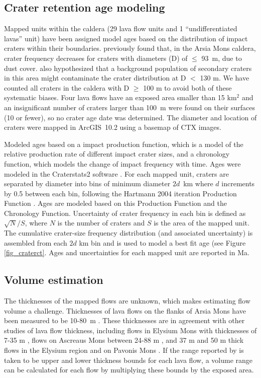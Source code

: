\subsection{Crater retention age modeling}

Mapped units within the caldera (29 lava flow units and 1 ``undifferentiated lavas'' unit) have been assigned model ages based on the distribution of impact craters within their boundaries. \citet{robbins2011volcanic} previously found that, in the Arsia Mons caldera, crater frequency decreases for craters with diameters (D) of $\le$ 93~m, due to dust cover. \citet{robbins2011volcanic} also hypothesized that a background population of secondary craters in this area might contaminate the crater distribution at D $<$ 130 m. We have counted all craters in the caldera with D $\ge$ 100 m to avoid both of these systematic biases. Four lava flows have an exposed area smaller than 15 km$^2$ and an insignificant number of craters larger than 100~m were found on their surfaces (10 or fewer), so no crater age date was determined. The diameter and location of craters were mapped in ArcGIS~10.2 using a basemap of CTX images.

Modeled ages based on a impact production function, which is a model of the relative production rate of different impact crater sizes, and a chronology function, which models the change of impact frequency with time. Ages were modeled in the Craterstats2 software \citep{michael2013planetary}. For each mapped unit, craters are separated by diameter into bins of minimum diameter $2d$~km where $d$ increments by 0.5 between each bin, following the Hartmann 2004 iteration Production Function \citep{hartmann2005martian}. Ages are modeled based on this Production Function and the \citet{michael2013planetary} Chronology Function. Uncertainty of crater frequency in each bin is defined as $\sqrt{N}/S$, where $N$ is the number of craters and $S$ is the area of the mapped unit. The cumulative crater-size frequency distribution (and associated uncertainty) is assembled from each $2d$ km bin and is used to model a best fit age (see Figure \ref{fig_craterct}. Ages and uncertainties for each mapped unit are reported in Ma.

\subsection{Volume estimation}\label{sec_volume}

The thicknesses of the mapped flows are unknown, which makes estimating flow volume a challenge. Thicknesses of lava flows on the flanks of Arsia Mons have been measured to be 10-80~m \citep{mouginis2008lava}. These thicknesses are in agreement with other studies of lava flow thickness, including flows in Elysium Mons with thicknesses of 7-35 m \citep{pasckert2012rheologies}, flows on Ascreaus Mons between 24-88 m \citep{hiesinger2007young}, and 37 m and 50 m thick flows in the Elysium region and on Pavonis Mons \citep{glaze2003methodology,baloga2003rheology}. If the range reported by \citet{mouginis2008lava} is taken to be upper and lower thickness bounds for each lava flow, a volume range can be calculated for each flow by multiplying these bounds by the exposed area.

